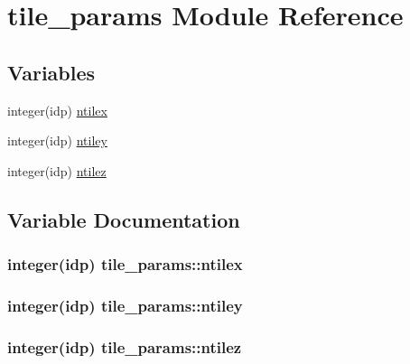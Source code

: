 \hypertarget{namespacetile__params}{}\section{tile\+\_\+params Module Reference}
\label{namespacetile__params}
\subsection*{Variables}
\begin{DoxyCompactItemize}
\item 
integer(idp) \hyperlink{namespacetile__params_a7208f23629d2bb2074bd84e2d014932c}{ntilex}
\item 
integer(idp) \hyperlink{namespacetile__params_a820079c73bdf0bd85aa8d2cf6b1a2b40}{ntiley}
\item 
integer(idp) \hyperlink{namespacetile__params_ac5c03752e70281443173d320d476f1e9}{ntilez}
\end{DoxyCompactItemize}


\subsection{Variable Documentation}
\subsubsection[{\texorpdfstring{ntilex}{ntilex}}]{\setlength{\rightskip}{0pt plus 5cm}integer(idp) tile\+\_\+params\+::ntilex}\hypertarget{namespacetile__params_a7208f23629d2bb2074bd84e2d014932c}{}\label{namespacetile__params_a7208f23629d2bb2074bd84e2d014932c}
\subsubsection[{\texorpdfstring{ntiley}{ntiley}}]{\setlength{\rightskip}{0pt plus 5cm}integer(idp) tile\+\_\+params\+::ntiley}\hypertarget{namespacetile__params_a820079c73bdf0bd85aa8d2cf6b1a2b40}{}\label{namespacetile__params_a820079c73bdf0bd85aa8d2cf6b1a2b40}
\subsubsection[{\texorpdfstring{ntilez}{ntilez}}]{\setlength{\rightskip}{0pt plus 5cm}integer(idp) tile\+\_\+params\+::ntilez}\hypertarget{namespacetile__params_ac5c03752e70281443173d320d476f1e9}{}\label{namespacetile__params_ac5c03752e70281443173d320d476f1e9}
